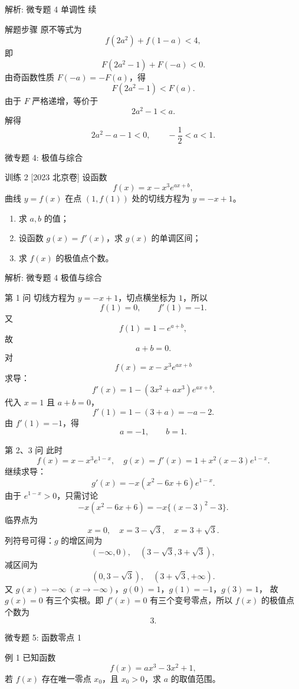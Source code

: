 ﻿\documentclass[aspectratio=169,10pt]{ctexbeamer}
\begin{document}
\begin{frame}[t,allowframebreaks]{解析: 微专题 4 单调性 续}
\tiny
\begin{block}{解题步骤}
原不等式为
\[
f(2a^2)+f(1-a)<4,
\]
即
\[
F(2a^2-1)+F(-a)<0.
\]
由奇函数性质 $F(-a)=-F(a)$，得
\[
F(2a^2-1)<F(a).
\]
由于 $F$ 严格递增，等价于
\[
2a^2-1<a.
\]
解得
\[
2a^2-a-1<0,\qquad -\frac12<a<1.
\]
\end{block}
\end{frame}

\begin{frame}[t]{微专题 4: 极值与综合}
\large
\begin{block}{训练 2}
[2023 北京卷] 设函数
\[
f(x)=x-x^3e^{ax+b},
\]
曲线 $y=f(x)$ 在点 $(1,f(1))$ 处的切线方程为 $y=-x+1$。
\begin{enumerate}
  \item 求 $a,b$ 的值；
  \item 设函数 $g(x)=f'(x)$，求 $g(x)$ 的单调区间；
  \item 求 $f(x)$ 的极值点个数。
\end{enumerate}
\end{block}
\end{frame}

\begin{frame}[t,allowframebreaks]{解析: 微专题 4 极值与综合}
\tiny
\begin{block}{第 1 问}
切线方程为 $y=-x+1$，切点横坐标为 $1$，所以
\[
f(1)=0,\qquad f'(1)=-1.
\]
又
\[
f(1)=1-e^{a+b},
\]
故
\[
a+b=0.
\]
对
\[
f(x)=x-x^3e^{ax+b}
\]
求导：
\[
f'(x)=1-\left(3x^2+ax^3\right)e^{ax+b}.
\]
代入 $x=1$ 且 $a+b=0$，
\[
f'(1)=1-(3+a)=-a-2.
\]
由 $f'(1)=-1$，得
\[
a=-1,\qquad b=1.
\]
\end{block}
\begin{block}{第 2、3 问}
此时
\[
f(x)=x-x^3e^{1-x},\quad g(x)=f'(x)=1+x^2(x-3)e^{1-x}.
\]
继续求导：
\[
g'(x)=-x(x^2-6x+6)e^{1-x}.
\]
由于 $e^{1-x}>0$，只需讨论
\[
-x(x^2-6x+6)=-x\{(x-3)^2-3\}.
\]
临界点为
\[
x=0,\quad x=3-\sqrt3,\quad x=3+\sqrt3.
\]
列符号可得：$g$ 的增区间为
\[
(-\infty,0),\quad (3-\sqrt3,3+\sqrt3),
\]
减区间为
\[
(0,3-\sqrt3),\quad (3+\sqrt3,+\infty).
\]
又 $g(x)\to-\infty\ (x\to-\infty)$，$g(0)=1$，$g(1)=-1$，$g(3)=1$，
故 $g(x)=0$ 有三个实根。即 $f'(x)=0$ 有三个变号零点，所以 $f(x)$ 的极值点个数为
\[
3.
\]
\end{block}
\end{frame}

\begin{frame}[t]{微专题 5: 函数零点 1}
\large
\begin{block}{例 1}
已知函数
\[
f(x)=ax^3-3x^2+1,
\]
若 $f(x)$ 存在唯一零点 $x_0$，且 $x_0>0$，求 $a$ 的取值范围。
\end{block}
\end{frame}
\end{document}

